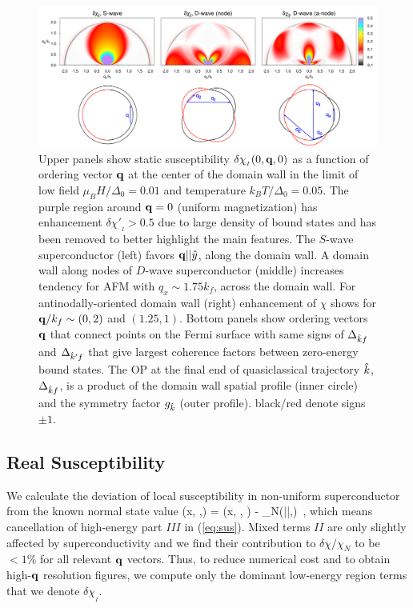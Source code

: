 \documentclass[prb,aps,showpacs,amsmath,twocolumn,10pt]{revtex4-1}
\begin{document}
\begin{figure}
\includegraphics[scale=0.14]{./Fig2}
\caption{\label{fig:2}
Upper panels show static
susceptibility $\delta\chi_{{}_I}(0,{\bf q},0)$ 
as a function of ordering vector ${\bf q}$ at the center of the domain wall in the limit of low field $\mu_B
H/\Delta_0=0.01$ and temperature $k_B T/\Delta_0=0.05$. 
The purple region around ${\bf q}=0$ (uniform magnetization) has enhancement $\delta\chi'_{{}_I}>0.5$ 
due to large density of 
bound states and has been removed to better highlight the main features. 
The $S$-wave superconductor (left) favors ${\bf q} || \hat{y}$, along the domain wall. 
A domain wall along nodes of $D$-wave superconductor (middle) increases tendency for AFM 
with $q_x \sim 1.75 k_f$, across the domain wall.
For antinodally-oriented domain wall (right) enhancement of $\chi$ shows for 
${\bf q}/k_f \sim (0,2)$ and $(1.25,1)$.
%
Bottom panels show ordering vectors ${\bf q}$ that connect points on the Fermi surface with same signs of 
$\Delta_{\hat{k} f }$ and $\Delta_{\hat{k}' f }$ that give largest coherence factors between zero-energy bound states. 
The OP at the final end of quasiclassical trajectory $\hat{k}$, $\Delta_{\hat{k} f }$, 
is a product of the domain wall spatial profile (inner circle) 
and the symmetry factor $g_{\hat{k}}$ (outer profile). black/red denote signs $\pm1$.
} 
\end{figure}

\subsection{Real Susceptibility}
\label{sec:realChi}
We calculate the deviation of local susceptibility in non-uniform superconductor from the known normal state value 
\be
\delta\chi(x, \vq,\omega) = \chi(x, \vq, \omega) - \chi_{N}(|\vq|,\omega) \,,
\ee
which means cancellation of high-energy part $III$ in (\ref{eq:sus}). 
Mixed terms $II$ are only slightly affected by superconductivity 
and we find their contribution to $\delta\chi/\chi_N$ to be $<1\%$ for all relevant ${\bf q}$ vectors. 
Thus, to reduce numerical cost and to obtain high-${\bf q}$ resolution figures, we compute 
only the dominant low-energy region terms that we denote $\delta\chi_{{}_I}$.
\end{document}

